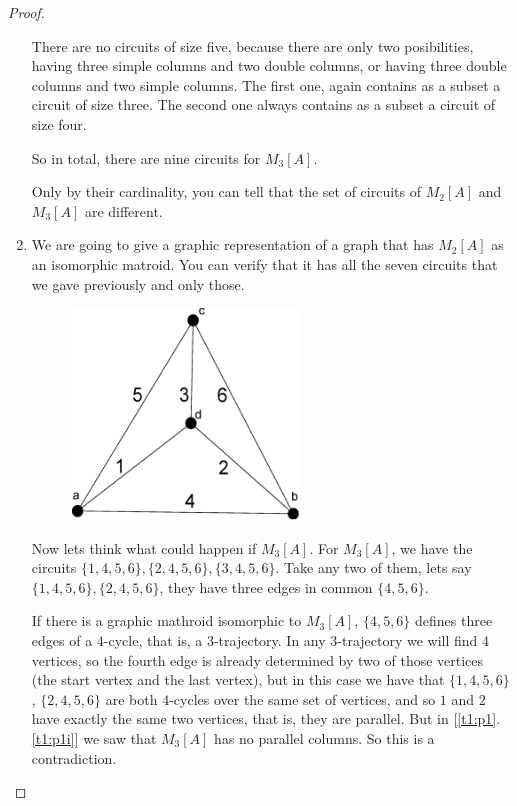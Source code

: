 \begin{proof}
\begin{enumerate}[label=(\roman*)]
            There are no circuits of size five, because there are only two posibilities, having three simple columns and two double columns, 
            or having three double  columns and two simple columns. The first one, again contains as a subset a circuit of size three.
            The second one always contains as a subset a circuit of size four.\pn
            
            So in total, there are nine circuits for $M_3[A]$.\pn
                        
            Only by their cardinality, you can tell that the set of circuits of $M_2[A]$ and $M_3[A]$ are different.
            
        \item\label{t1:p1ii}
            We are going to give a graphic representation of a graph that has $M_2[A]$ as an isomorphic matroid. You can
            verify that it has all the seven circuits that we gave previously and only those.\pn

            \begin{figure}[H]
                \centering
                    \caption{}
                    \includegraphics[width=6cm]{Test1/Problem1/tetrahedron.eps}
                \label{fig:tetrahedron}
            \end{figure}
            
            Now lets think what could happen if $M_3[A]$. For $M_3[A]$, we have the circuits 
            $\{1, 4, 5, 6\}, \{2, 4, 5, 6\}, \{3, 4, 5, 6\}$. Take any two of them, lets say
            $\{1, 4, 5, 6\}, \{2, 4, 5, 6\}$, they have three edges in common $\{4,5,6\}$. \pn
            
            If there is a graphic mathroid isomorphic to $M_3[A]$, $\{4,5,6\}$ defines three edges of a 
            $4$-cycle, that is, a $3$-trajectory. In any $3$-trajectory we will find $4$ vertices, so the fourth 
            edge is already determined by two of those vertices (the start vertex and the last vertex), but in this case 
            we have that $\{1, 4, 5, 6\}$, $\{2, 4, 5, 6\}$ are both $4$-cycles over the same set of vertices, 
            and so $1$ and $2$ have exactly the same two vertices, that is, they are parallel. But in [\ref{t1:p1}.\ref{t1:p1i}]
            we saw that $M_3[A]$ has no parallel columns. So this is a contradiction.
        

\end{enumerate}
\end{proof}
